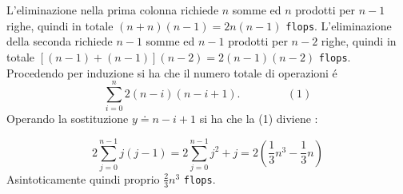 L'eliminazione nella prima colonna richiede $n$ somme ed $n$ prodotti per $n-1$ righe, quindi in totale $(n+n)(n-1) = 2n(n-1)$ \texttt{flops}. L'eliminazione della seconda richiede $n-1$ somme ed $n-1$ prodotti per $n-2$ righe, quindi in totale $[(n-1)+(n-1)](n-2) = 2(n-1)(n-2)$ \texttt{flops}.\\
Procedendo per induzione si ha che il numero totale di operazioni \'e
\[
\sum_{i=0}^{n} 2(n-i)(n-i+1). \hspace{50pt} (1)
\]
Operando la sostituzione $y \doteq n-i+1$ si ha che la (1) diviene :
 
\[
2 \sum_{j=0}^{n-1} j(j-1) = 2 \sum_{j=0}^{n-1}j^2 + j = 2 ( \frac{1}{3}n^3 - \frac{1}{3}n)
\]
Asintoticamente quindi proprio $\frac{2}{3}n^3$ \texttt{flops}.